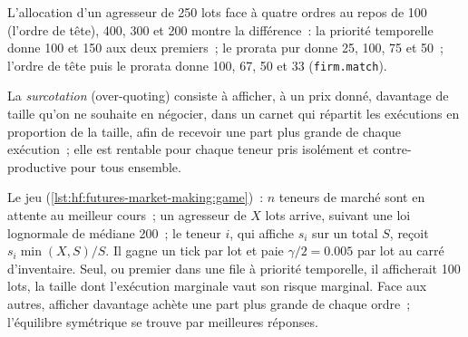L'allocation d'un agresseur de 250 lots face à quatre ordres au repos de 100 (l'ordre de tête), 400, 300 et 200 montre la différence~: la priorité temporelle
donne 100 et 150 aux deux premiers~; le prorata pur donne 25, 100, 75 et 50~; l'ordre de tête puis le prorata donne 100, 67, 50 et 33 (\texttt{firm.match}).

\begin{definition}[Surcotation]\label{def:hf:futures-market-making:over}
La \emph{surcotation} (over-quoting) consiste à afficher, à un prix donné, davantage de taille qu'on ne souhaite en négocier, dans un carnet qui répartit les exécutions en
proportion de la taille, afin de recevoir une part plus grande de chaque exécution~; elle est rentable pour chaque teneur pris isolément et contre-productive pour tous ensemble.
\end{definition}

Le jeu (\cref{lst:hf:futures-market-making:game})~: $n$ teneurs de marché sont en attente au meilleur cours~; un agresseur de $X$ lots arrive, suivant une loi lognormale de
médiane 200~; le teneur $i$, qui affiche $s_i$ sur un total $S$, reçoit $s_i\min(X,S)/S$. Il gagne un tick par lot et paie $\gamma/2=0.005$ par lot au carré
d'inventaire. Seul, ou premier dans une file à priorité temporelle, il afficherait 100 lots, la taille dont l'exécution marginale vaut son risque marginal. Face aux autres,
afficher davantage achète une part plus grande de chaque ordre~; l'équilibre symétrique se trouve par meilleures réponses.

\begin{omfigure}

\label{fig:hf:futures-market-making:over}
\end{omfigure}

